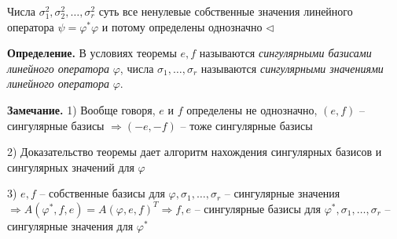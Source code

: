 \bigskip
Числа $\sigma_1^2, \sigma_2^2, \dots, \sigma_r^2$ суть все ненулевые собственные значения линейного оператора $\psi = \varphi^* \varphi$ и потому определены однозначно $\lhd$

\bigskip
\textbf{Определение.} В условиях теоремы $e, f$ называются \textit{сингулярными базисами линейного оператора} $\varphi$, числа $\sigma_1, \dots, \sigma_r$ называются \textit{сингулярными значениями линейного оператора} $\varphi$.

\bigskip
\textbf{Замечание.} 1) Вообще говоря, $e$ и $f$ определены не однозначно, $(e, f)$ -- сингулярные базисы $\Rightarrow (-e, -f)$ -- тоже сингулярные базисы

2) Доказательство теоремы дает алгоритм нахождения сингулярных базисов и сингулярных значений для $\varphi$

3) $e, f$ -- собственные базисы для $\varphi, \sigma_1, \dots, \sigma_r$ -- сингулярные значения $\Rightarrow A(\varphi^*, f, e) = A(\varphi, e, f)^T \Rightarrow f, e$ -- сингулярные базисы для $\varphi^*, \sigma_1, \dots, \sigma_r$ -- сингулярные значения для $\varphi^*$

